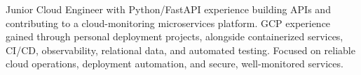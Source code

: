 \par{
Junior Cloud Engineer with Python/FastAPI experience building APIs and contributing to a cloud-monitoring microservices platform. GCP experience gained through personal deployment projects, alongside containerized services, CI/CD, observability, relational data, and automated testing. Focused on reliable cloud operations, deployment automation, and secure, well-monitored services.
}
